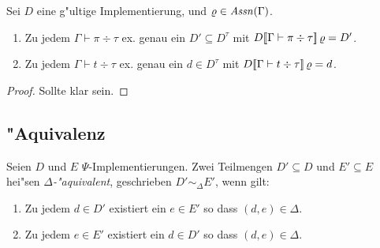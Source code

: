 \documentclass[%
  12pt,%
  a4paper,%
]{article}
\newcommand{\Tj}[3]{{#1}\vdash{#2}\div{#3}}
\begin{document}
\begin{lemma} \label{lem:Wohldefiniertheit_der_Semantik}
  Sei $D$ eine g"ultige Implementierung, und $\varrho \in \mathit{Assn}(\Gamma)$.
  \begin{enumerate}
  \item Zu jedem $\Tj{\Gamma}{\pi}{\tau}$ ex. genau ein $D' \subseteq D^\tau$ mit
    $D\sem{\Tj{\Gamma}{\pi}{\tau}}\,\varrho = D'$.
  \item Zu jedem $\Tj{\Gamma}{t}{\tau}$ ex. genau ein $d \in D^\tau$ mit
    $D\sem{\Tj{\Gamma}{t}{\tau}}\,\varrho = d$.
  \end{enumerate}
\end{lemma}

\begin{proof}
  Sollte klar sein.
\end{proof}

\subsection*{"Aquivalenz}

Seien $D$ und $E$ $\Psi$-Implementierungen. Zwei Teilmengen $D' \subseteq D$ und $E' \subseteq E$
hei"sen \emph{$\Delta$-"aquivalent}, geschrieben $D' \sim_\Delta E'$, wenn gilt:
\begin{enumerate}
\item Zu jedem $d \in D'$ existiert ein $e \in E'$ so dass $(d,e) \in \Delta$.
\item Zu jedem $e \in E'$ existiert ein $d \in D'$ so dass $(d,e) \in \Delta$.
\end{enumerate}
\end{document}
